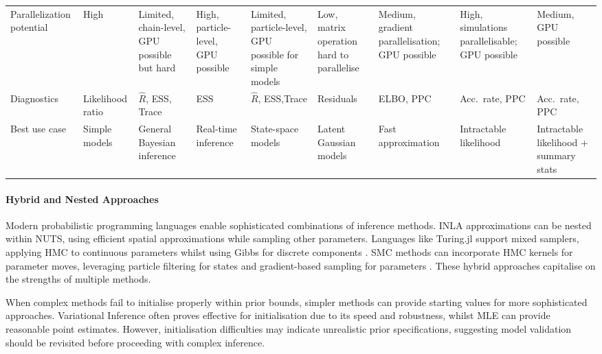 \documentclass{article}
\begin{document}
\begin{landscape}
\begin{table}[ht]
\begin{tabular}{@{}p{3.5cm}p{1.5cm}p{1.5cm}p{1.5cm}p{1.5cm}p{1.5cm}p{1.5cm}p{1.5cm}p{1.5cm}@{}}
Parallelization potential & 
High & 
Limited, chain-level, GPU possible but hard & 
High, particle-level, GPU possible & 
Limited, particle-level, GPU possible for simple models & 
Low, matrix operation hard to parallelise & 
Medium, gradient parallelisation; GPU possible & 
High, simulations parallelisable; GPU possible & 
Medium, GPU possible \\
Diagnostics & Likelihood ratio & $\hat{R}$, ESS, Trace& ESS & $\hat{R}$, ESS,Trace & Residuals & ELBO, PPC & Acc.~rate, PPC & Acc.~rate, PPC \\
Best use case & Simple models & General Bayesian inference & Real-time inference & State-space models & Latent Gaussian models & Fast approximation & Intractable likelihood & Intractable likelihood + summary stats \\
\bottomrule
\end{tabular}
\end{table}
\end{landscape}


\paragraph{Hybrid and Nested Approaches}

Modern probabilistic programming languages enable sophisticated combinations of inference methods.
INLA approximations can be nested within NUTS, using efficient spatial approximations while sampling other parameters.
Languages like Turing.jl support mixed samplers, applying HMC to continuous parameters whilst using Gibbs for discrete components \citet{fjelde2025turing}.
SMC methods can incorporate HMC kernels for parameter moves, leveraging particle filtering for states and gradient-based sampling for parameters \citet{buchholz2021adaptive, devlin2024no, rosato2024enhanced}.
These hybrid approaches capitalise on the strengths of multiple methods.

When complex methods fail to initialise properly within prior bounds, simpler methods can provide starting values for more sophisticated approaches.
Variational Inference often proves effective for initialisation due to its speed and robustness, whilst MLE can provide reasonable point estimates.
However, initialisation difficulties may indicate unrealistic prior specifications, suggesting model validation should be revisited before proceeding with complex inference.
\end{document}
